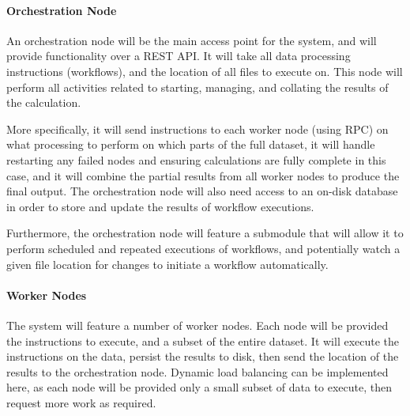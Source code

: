 \documentclass[12pt]{article}
\begin{document}
	\begin{center}
	\end{center}
	
	\paragraph{Orchestration Node}
	An orchestration node will be the main access point for the system, and will provide functionality over a REST API. It will take all data processing instructions (workflows), and the location of all files to execute on. This node will perform all activities related to starting, managing, and collating the results of the calculation. \medskip
	
	More specifically, it will send instructions to each worker node (using RPC) on what processing to perform on which parts of the full dataset, it will handle restarting any failed nodes and ensuring calculations are fully complete in this case, and it will combine the partial results from all worker nodes to produce the final output. The orchestration node will also need access to an on-disk database in order to store and update the results of workflow executions.
	
	Furthermore, the orchestration node will feature a submodule that will allow it to perform scheduled and repeated executions of workflows, and potentially watch a given file location for changes to initiate a workflow automatically.
	
	\paragraph{Worker Nodes}
	The system will feature a number of worker nodes. Each node will be provided the instructions to execute, and a subset of the entire dataset. It will execute the instructions on the data, persist the results to disk, then send the location of the results to the orchestration node. Dynamic load balancing can be implemented here, as each node will be provided only a small subset of data to execute, then request more work as required.
	
\end{document}
